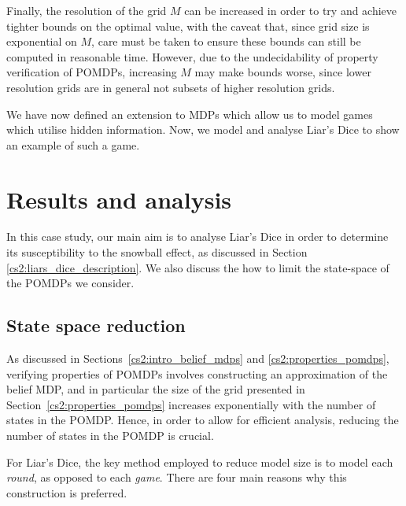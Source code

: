 Finally, the resolution of the grid $M$ can be increased in order to try and achieve tighter bounds on the optimal value, with the caveat that, since grid size is exponential on $M$, care must be taken to ensure these bounds can still be computed in reasonable time. However, due to the undecidability of property verification of POMDPs, increasing $M$ may make bounds worse, since lower resolution grids are in general not subsets of higher resolution grids.

We have now defined an extension to MDPs which allow us to model games which utilise hidden information. Now, we model and analyse Liar's Dice to show an example of such a game.

\section{Results and analysis}

In this case study, our main aim is to analyse Liar's Dice in order to determine its susceptibility to the snowball effect, as discussed in Section \ref{cs2:liars_dice_description}. We also discuss the how to limit the state-space of the POMDPs we consider.

\subsection{State space reduction}
\label{cs2:state_reduction}

As discussed in Sections~\ref{cs2:intro_belief_mdps} and \ref{cs2:properties_pomdps}, verifying properties of POMDPs involves constructing an approximation of the belief MDP, and in particular the size of the grid presented in Section~\ref{cs2:properties_pomdps} increases exponentially with the number of states in the POMDP. Hence, in order to allow for efficient analysis, reducing the number of states in the POMDP is crucial.

For Liar's Dice, the key method employed to reduce model size is to model each \emph{round}, as opposed to each \emph{game}. There are four main reasons why this construction is preferred.

